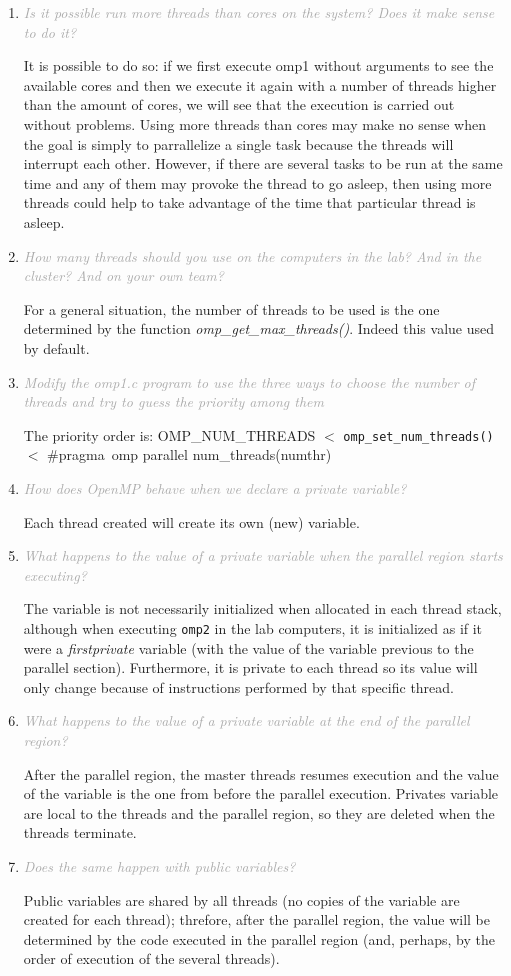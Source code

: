 \documentclass{article}
\newcommand{\greyItem}[1]{\item\emph{\textcolor{darkgray}{#1}}}
\begin{document}
\begin{enumerate}[label=1.\arabic*,leftmargin=*]
\greyItem{Is it possible run more threads than cores on the system? Does it make sense to do it?}

It is possible to do so: if we first execute omp1 without arguments to see the available cores and then we execute it again with a number of threads higher than the amount of cores, we will see that the execution is carried out without problems. Using more threads than cores may make no sense when the goal is simply to parrallelize a single task because the threads will interrupt each other. However, if there are several tasks to be run at the same time and any of them may provoke the thread to go asleep, then using more threads could help to take advantage of the time that particular thread is asleep. 


\greyItem{How many threads should you use on the computers in the lab? And in the cluster? And on your own team?} 

For a general situation, the number of threads to be used is the one determined by the function \emph{omp\_get\_max\_threads()}. Indeed this value used by default.

\greyItem{Modify the omp1.c program to use the three ways to choose the number of threads and try to guess the priority among them}

The priority order is: \texttt{}{OMP\_NUM\_THREADS} $<$ \texttt{omp\_set\_num\_threads()} $<$ \#pragma\ omp parallel num\_threads(numthr) 

\greyItem{How does OpenMP behave when we declare a private variable?}

Each thread created will create its own (new) variable.

\greyItem{What happens to the value of a private variable when the parallel region starts executing?}

The variable is not necessarily initialized when allocated in each thread stack, although when executing \texttt{omp2} in the lab computers, it is initialized as if it were a \emph{firstprivate} variable (with the value of the variable previous to the parallel section). Furthermore, it is private to each thread so its value will only change because of instructions performed by that specific thread.

\greyItem{What happens to the value of a private variable at the end of the parallel region?}

After the parallel region, the master threads resumes execution and the value of the variable is the one from before the parallel execution. Privates variable are local to the threads and the parallel region, so they are deleted when the threads terminate.

\greyItem{Does the same happen with public variables?}

Public variables are shared by all threads (no copies of the variable are created for each thread); threfore, after the parallel region, the value will be determined by the code executed in the parallel region (and, perhaps, by the order of execution of the several threads).

\end{enumerate}
\end{document}
